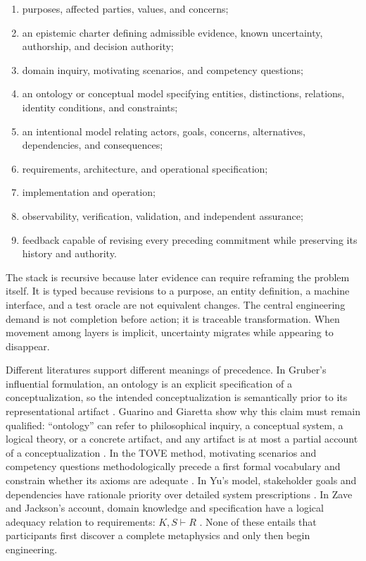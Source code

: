 \documentclass[10pt,a4paper]{article}
\begin{document}
\begin{enumerate}
  \item purposes, affected parties, values, and concerns;
  \item an epistemic charter defining admissible evidence, known uncertainty, authorship, and decision authority;
  \item domain inquiry, motivating scenarios, and competency questions;
  \item an ontology or conceptual model specifying entities, distinctions, relations, identity conditions, and constraints;
  \item an intentional model relating actors, goals, concerns, alternatives, dependencies, and consequences;
  \item requirements, architecture, and operational specification;
  \item implementation and operation;
  \item observability, verification, validation, and independent assurance;
  \item feedback capable of revising every preceding commitment while preserving its history and authority.
\end{enumerate}

The stack is recursive because later evidence can require reframing the problem itself. It is typed because revisions to a purpose, an entity definition, a machine interface, and a test oracle are not equivalent changes. The central engineering demand is not completion before action; it is traceable transformation. When movement among layers is implicit, uncertainty migrates while appearing to disappear.

Different literatures support different meanings of precedence. In Gruber's influential formulation, an ontology is an explicit specification of a conceptualization, so the intended conceptualization is semantically prior to its representational artifact \cite{gruber1993}. Guarino and Giaretta show why this claim must remain qualified: ``ontology'' can refer to philosophical inquiry, a conceptual system, a logical theory, or a concrete artifact, and any artifact is at most a partial account of a conceptualization \cite{guarino1995}. In the TOVE method, motivating scenarios and competency questions methodologically precede a first formal vocabulary and constrain whether its axioms are adequate \cite{gruninger1995}. In Yu's model, stakeholder goals and dependencies have rationale priority over detailed system prescriptions \cite{yu1997}. In Zave and Jackson's account, domain knowledge and specification have a logical adequacy relation to requirements: $K,S \vdash R$ \cite{zavejackson1997}. None of these entails that participants first discover a complete metaphysics and only then begin engineering.
\end{document}
